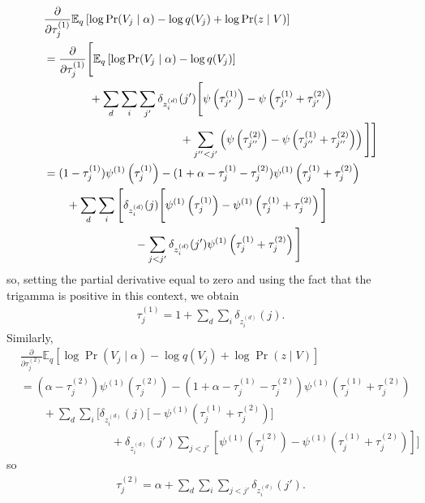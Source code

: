 \documentclass{article}
\newcommand{\digamma}[1]{\ensuremath{\psi\left(#1\right)}}
\newcommand{\trigamma}[1]{\ensuremath{\psi^{(1)}\left(#1\right)}}
\newcommand{\Elogdirichlet}[2]{\ensuremath{\digamma{#1} - \digamma{#2}}}
\newcommand{\Elogbeta}[3]{\Elogdirichlet{\ifnum#3=1\relax#1\else#2\fi}{#1 + #2}}
\newcommand{\Eq}{\ensuremath{\mathbb{E}_q\xspace}}
\newcommand{\leftsibling}{\ensuremath{<}}
\newcommand{\pd}[1]{\ensuremath{\frac{\partial}{\partial #1}}}
\begin{document}
\begin{align*}
    &\pd{\tau_{j}^{(1)}} \Eq \left[ \log \Pr(V_j \mid \alpha) - \log q(V_j) + \log \Pr(z \mid V) \right] \\
    &= \pd{\tau_{j}^{(1)}} \Bigg[ \Eq \left[ \log \Pr(V_j \mid \alpha) - \log q(V_j) \right] \\
        &\qquad\qquad + \sum_d \sum_i \sum_{j'} \delta_{z_i^{(d)}}({j'}) \Bigg[ \Elogbeta{\tau_{j'}^{(1)}}{\tau_{j'}^{(2)}}{1} \\
        &\qquad\qquad\qquad\qquad\qquad\qquad + \sum_{j'' < j'}\left( \Elogbeta{\tau_{j''}^{(1)}}{\tau_{j''}^{(2)}}{2} \right)\Bigg] \Bigg] \\
    &= (1 - \tau^{(1)}_j) \trigamma{\tau^{(1)}_j} - (1 + \alpha - \tau^{(1)}_j - \tau^{(2)}_j) \trigamma{\tau^{(1)}_j + \tau^{(2)}_j} \\
        &\qquad + \sum_d \sum_i \Bigg[ \delta_{z_i^{(d)}}({j}) \Bigg[ \trigamma{\tau_{j}^{(1)}} - \trigamma{\tau_{j}^{(1)} + \tau_{j}^{(2)}} \Bigg] \\
        &\qquad\qquad\qquad\qquad - \sum_{j \leftsibling j'} \delta_{z_i^{(d)}}(j') \trigamma{\tau_{j}^{(1)} + \tau_{j}^{(2)}} \Bigg]
\end{align*}
so, setting the partial derivative equal to zero and using the fact that the trigamma is positive in this context, we obtain
\begin{align*}
    \boxed{ \tau^{(1)}_j = 1 + \sum_d \sum_i \delta_{z_i^{(d)}}({j}) }.
\end{align*}
Similarly,
\begin{align*}
    &\pd{\tau_{j}^{(2)}} \Eq \left[ \log \Pr(V_j \mid \alpha) - \log q(V_j) + \log \Pr(z \mid V) \right] \\
    &= (\alpha - \tau^{(2)}_j) \trigamma{\tau^{(2)}_j} - (1 + \alpha - \tau^{(1)}_j - \tau^{(2)}_j) \trigamma{\tau^{(1)}_j + \tau^{(2)}_j} \\
        &\qquad + \sum_d \sum_i \Bigg[ \delta_{z_i^{(d)}}({j}) \Bigg[ - \trigamma{\tau_{j}^{(1)} + \tau_{j}^{(2)}} \Bigg] \\
        &\qquad\qquad\qquad\qquad + \delta_{z_i^{(d)}}(j') \sum_{j \leftsibling j'} \left[ \trigamma{\tau_{j}^{(2)}} - \trigamma{\tau_{j}^{(1)} + \tau_{j}^{(2)}} \right] \Bigg]
\end{align*}
so
\begin{align*}
    \boxed{ \tau^{(2)}_j = \alpha + \sum_d \sum_i \sum_{j \leftsibling j'} \delta_{z_i^{(d)}}({j'}) }.
\end{align*}
\end{document}
